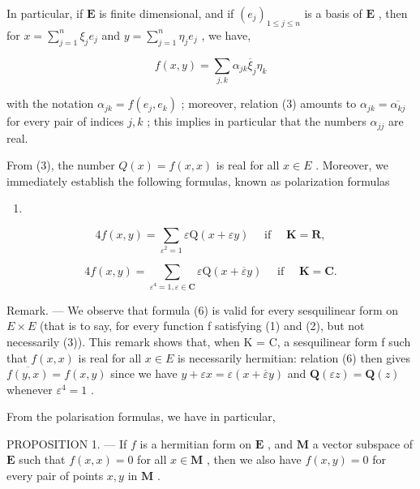 In particular, if \(\mathbf{E}\) is finite dimensional, and if \((e_j)_{1 \leqslant j \leqslant n}\) is a basis of \(\mathbf{E}\) , then for \(x = \sum_{j=1}^{n} \xi_j e_j\) and \(y = \sum_{j=1}^{n} \eta_j e_j\) , we have,

\[
f (x, y) = \sum_ {j, k} \alpha_ {j k} \overline {{{{\xi}}}} _ {j} \eta_ {k}
\]

with the notation \(\alpha_{jk} = f(e_j, e_k)\) ; moreover, relation (3) amounts to \(\alpha_{jk} = \overline{\alpha_{kj}}\) for every pair of indices \(j, k\) ; this implies in particular that the numbers \(\alpha_{jj}\) are real.

From (3), the number \(Q(x) = f(x, x)\) is real for all \(x \in E\) . Moreover, we immediately establish the following formulas, known as polarization formulas

\begin{enumerate}
\def\labelenumi{(\arabic{enumi})}
\setcounter{enumi}{4}
\tightlist
\item
\end{enumerate}

\[
4 f (x, y) = \sum_ {\varepsilon^ {2} = 1} \varepsilon \mathrm{Q} (x + \varepsilon y) \quad \text { if } \quad \mathbf {K} = \mathbf {R},\tag{6}
\]

\[
4 f (x, y) = \sum_ {\varepsilon^ {4} = 1, \varepsilon \in \mathbf {C}} \varepsilon \mathrm{Q} (x + \overline {{{\varepsilon}}} y) \quad \text { if } \quad \mathbf {K} = \mathbf {C}.
\]

Remark. --- We observe that formula (6) is valid for every sesquilinear form on \(E \times E\) (that is to say, for every function f satisfying (1) and (2), but not necessarily (3)). This remark shows that, when K = C, a sesquilinear form f such that \(f(x, x)\) is real for all \(x \in E\) is necessarily hermitian: relation (6) then gives \(\overline{f(y, x)} = f(x, y)\) since we have \(y + \varepsilon x = \varepsilon(x + \overline{\varepsilon}y)\) and \(\mathbf{Q}(\varepsilon z) = \mathbf{Q}(z)\) whenever \(\varepsilon^{4} = 1\) .

From the polarisation formulas, we have in particular,

PROPOSITION 1. --- If \(f\) is a hermitian form on \(\mathbf{E}\) , and \(\mathbf{M}\) a vector subspace of \(\mathbf{E}\) such that \(f(x, x) = 0\) for all \(x \in \mathbf{M}\) , then we also have \(f(x, y) = 0\) for every pair of points \(x, y\) in \(\mathbf{M}\) .

